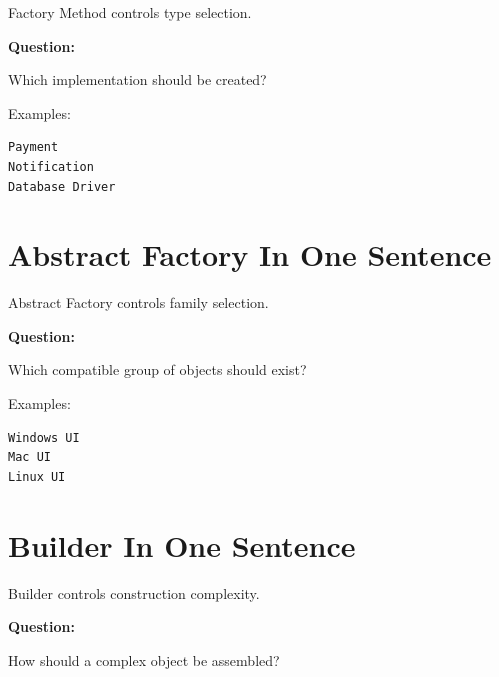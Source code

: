 \documentclass[11pt,a4paper]{book}
\begin{document}
\begin{idea}

Factory Method controls type selection.

\end{idea}

\textbf{Question:}

\begin{center}
Which implementation should be created?
\end{center}

Examples:

\begin{verbatim}
Payment
Notification
Database Driver
\end{verbatim}


\section{Abstract Factory In One Sentence}

\begin{idea}

Abstract Factory controls family selection.

\end{idea}

\textbf{Question:}

\begin{center}
Which compatible group of objects should exist?
\end{center}

Examples:

\begin{verbatim}
Windows UI
Mac UI
Linux UI
\end{verbatim}


\section{Builder In One Sentence}

\begin{idea}

Builder controls construction complexity.

\end{idea}

\textbf{Question:}

\begin{center}
How should a complex object be assembled?
\end{center}
\end{document}
